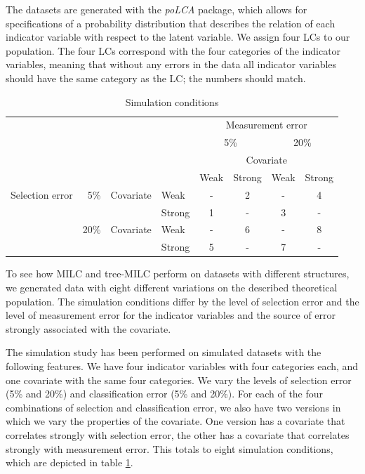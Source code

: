 \documentclass[a4paper, 11pt]{article} %
\begin{document}
The datasets are generated with the \textit{poLCA} package, which allows for specifications of a probability distribution that describes the relation of each indicator variable with respect to the latent variable. We assign four LCs to our population. The four LCs correspond with the four categories of the indicator variables, meaning that without any errors in the data all indicator variables should have the same category as the LC; the numbers should match. 
\begin{table}[hb]
\centering
\caption{Simulation conditions}
\hspace{3cm}
\begin{tabular}{lrllcccc}
\hline
&&&& \multicolumn{4}{c}{Measurement error}\\ \cline{5-8} 
&&&& \multicolumn{2}{c}{5\%} & \multicolumn{2}{c}{20\%} \\ \cline{5-8} 
&&&& \multicolumn{4}{c}{Covariate} \\ \cline{5-8} 
&&&& Weak      & Strong      & Weak       & Strong      \\ \hline
Selection error & 5\%  & Covariate & Weak   & - & 2 & - & 4 \\ \cline{4-8} 
&&& Strong & 1 & - & 3 & - \\ \cline{2-8} 
& 20\% & Covariate & Weak   & - & 6 & - & 8 \\ \cline{4-8} 
&&& Strong & 5 & - & 7 & - \\ \hline
\end{tabular}
\label{Tab:sim_conditions8}
\end{table}

To see how MILC and tree-MILC perform on datasets with different structures, we generated data with eight different variations on the described theoretical population. The simulation conditions differ by the level of selection error and the level of measurement error for the indicator variables and the source of error strongly associated with the covariate. 

The simulation study has been performed on simulated datasets with the following features. We have four indicator variables with four categories each, and one covariate with the same four categories. We vary the levels of selection error (5\% and 20\%) and classification error (5\% and 20\%). For each of the four combinations of selection and classification error, we also have two versions in which we vary the properties of the covariate. One version has a covariate that correlates strongly with selection error, the other has a covariate that correlates strongly with measurement error. This totals to eight simulation conditions, which are depicted in table \ref{Tab:sim_conditions8}.
\end{document}
